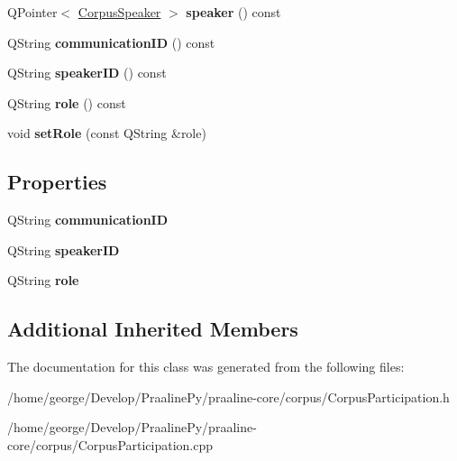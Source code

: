 \begin{DoxyCompactItemize}
\item 
\mbox{\label{class_corpus_participation_a1950c5466a90b664c752ff3573495322}} 
Q\+Pointer$<$ \hyperlink{class_corpus_speaker}{Corpus\+Speaker} $>$ {\bfseries speaker} () const
\item 
\mbox{\label{class_corpus_participation_a0af2fa63aa99ee59757c773b95f01114}} 
Q\+String {\bfseries communication\+ID} () const
\item 
\mbox{\label{class_corpus_participation_a7b690bc0313ce0b951d05e46743e6c3a}} 
Q\+String {\bfseries speaker\+ID} () const
\item 
\mbox{\label{class_corpus_participation_a295d64eae755449305efca0c81a6bdc7}} 
Q\+String {\bfseries role} () const
\item 
\mbox{\label{class_corpus_participation_ab511b1f01cabbfdb546d980d6267bf6b}} 
void {\bfseries set\+Role} (const Q\+String \&role)
\end{DoxyCompactItemize}
\subsection*{Properties}
\begin{DoxyCompactItemize}
\item 
\mbox{\label{class_corpus_participation_a4fd5793010831cc4a61e940a5015116e}} 
Q\+String {\bfseries communication\+ID}
\item 
\mbox{\label{class_corpus_participation_a705af6c5979e4baa899e7c8c948bb39e}} 
Q\+String {\bfseries speaker\+ID}
\item 
\mbox{\label{class_corpus_participation_ac20d274dc5f43f1a14a3380bbc55e841}} 
Q\+String {\bfseries role}
\end{DoxyCompactItemize}
\subsection*{Additional Inherited Members}


The documentation for this class was generated from the following files\+:\begin{DoxyCompactItemize}
\item 
/home/george/\+Develop/\+Praaline\+Py/praaline-\/core/corpus/Corpus\+Participation.\+h\item 
/home/george/\+Develop/\+Praaline\+Py/praaline-\/core/corpus/Corpus\+Participation.\+cpp\end{DoxyCompactItemize}
